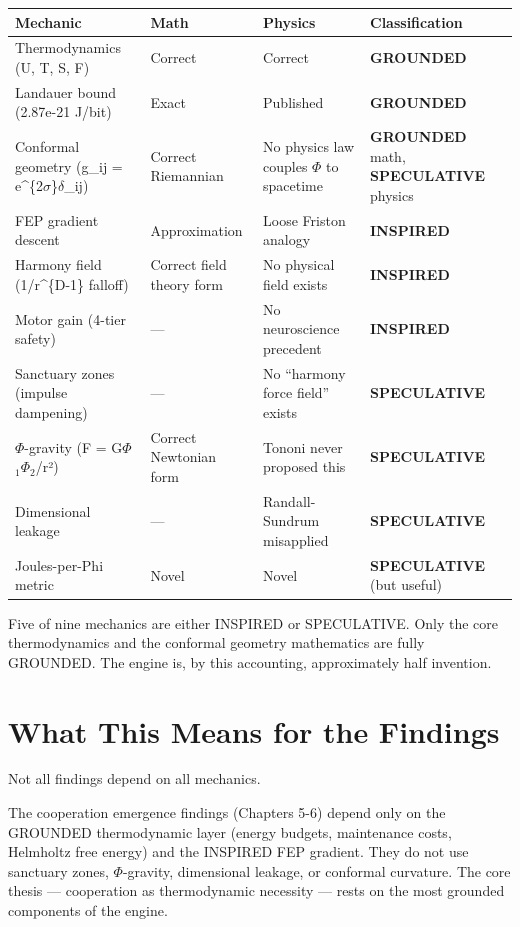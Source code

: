 \begin{longtable}[]{@{}llll@{}}
\toprule\noalign{}
Mechanic & Math & Physics & Classification \\
\midrule\noalign{}
\endhead
\bottomrule\noalign{}
\endlastfoot
Thermodynamics (U, T, S, F) & Correct & Correct & \textbf{GROUNDED} \\
Landauer bound (2.87e-21 J/bit) & Exact & Published & \textbf{GROUNDED} \\
Conformal geometry (g\_ij = e\^{}\{2$\sigma$\}$\delta$\_ij) & Correct Riemannian & No physics law couples $\Phi$ to spacetime & \textbf{GROUNDED} math, \textbf{SPECULATIVE} physics \\
FEP gradient descent & Approximation & Loose Friston analogy & \textbf{INSPIRED} \\
Harmony field (1/r\^{}\{D-1\} falloff) & Correct field theory form & No physical field exists & \textbf{INSPIRED} \\
Motor gain (4-tier safety) & --- & No neuroscience precedent & \textbf{INSPIRED} \\
Sanctuary zones (impulse dampening) & --- & No ``harmony force field'' exists & \textbf{SPECULATIVE} \\
$\Phi$-gravity (F = G$\Phi$$_1$$\Phi$$_2$/r²) & Correct Newtonian form & Tononi never proposed this & \textbf{SPECULATIVE} \\
Dimensional leakage & --- & Randall-Sundrum misapplied & \textbf{SPECULATIVE} \\
Joules-per-Phi metric & Novel & Novel & \textbf{SPECULATIVE} (but useful) \\
\end{longtable}

Five of nine mechanics are either INSPIRED or SPECULATIVE. Only the core thermodynamics and the conformal geometry mathematics are fully GROUNDED. The engine is, by this accounting, approximately half invention.

\section{What This Means for the Findings}\label{what-this-means-for-the-findings}

Not all findings depend on all mechanics.

The cooperation emergence findings (Chapters 5-6) depend only on the GROUNDED thermodynamic layer (energy budgets, maintenance costs, Helmholtz free energy) and the INSPIRED FEP gradient. They do not use sanctuary zones, $\Phi$-gravity, dimensional leakage, or conformal curvature. The core thesis --- cooperation as thermodynamic necessity --- rests on the most grounded components of the engine.

